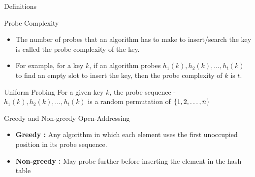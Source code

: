 \documentclass{beamer}
\begin{document}
\begin{frame} {Definitions}
	\begin{block}{Probe Complexity}
		\begin{itemize}
			\item The number of probes that an algorithm has to make to insert/search the key is called the probe complexity of the key.
			\item For example, for a key $k$, if an algorithm probes $h_1(k), h_2(k), \ldots, h_t(k)$ to find an empty slot to insert the key, then the probe complexity of $k$ is $t$.
		\end{itemize}
	\end{block}

\begin{block}{Uniform Probing}
	For a given key $k$, the probe sequence - $h_1(k), h_2(k), \ldots, h_t(k)$ is a random permutation of $\left\{ 1, 2, \ldots,n  \right\}$
\end{block}
\end{frame}


\begin{frame}{Greedy and Non-greedy Open-Addressing}
	\begin{itemize}
		\item {\bf Greedy :}  Any algorithm in which each element uses the first unoccupied position in its probe sequence.
		\item {\bf Non-greedy :} May probe further before inserting the element in the hash table
	\end{itemize}
	
\end{frame}
\end{document}

